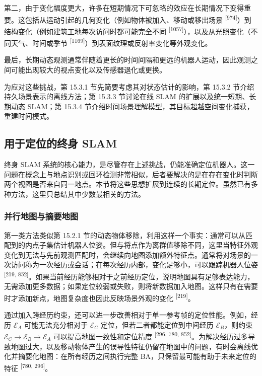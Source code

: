 第二，由于变化幅度更大，许多在短期情况下可忽略的效应在长期情况下变得重要。这包括从运动引起的几何变化（例如物体被加入、移动或移出场景 \textsuperscript{[974]}）到结构变化（例如建筑工地每次访问时都可能完全不同 \textsuperscript{[1057]}），以及从光照变化（不同天气、时间或季节 \textsuperscript{[1169]}）到表面纹理或反射率变化等外观变化。

最后，长期动态观测通常伴随着更长的时间间隔和更远的机器人运动，因此观测之间可能出现较大的视点变化以及传感器退化或更换。

为应对这些挑战，第 15.3.1 节先简要考虑其对状态估计的影响，第 15.3.2 节介绍持久场景表示的离线方法；第 15.3.3 节讨论在线 SLAM 的扩展以及统一短期、长期动态 SLAM；第 15.3.4 节介绍时间场景理解模型，其目标超越空间变化捕获，重建时间模式。

\subsection{用于定位的终身 SLAM}

终身 SLAM 系统的核心能力，是尽管存在上述挑战，仍能准确定位机器人。这一问题在概念上与地点识别或回环检测非常相似，后者要解决的是在存在变化时判断两个视图是否来自同一地点。本节将这些思想扩展到连续的长期定位。虽然已有多种方法，这里只总结其中少数最相关的方法。

\subsubsection{并行地图与摘要地图}

第一类方法类似第 15.2.1 节的动态物体移除，利用这样一个事实：通常可以从匹配到的内点子集估计机器人位姿。但与将点作为离群值移除不同，这里当特征外观变化到无法与先前观测匹配时，会继续向地图添加额外特征点。通常将对场景的一次访问称为一次经历或会话；在每次经历内部，变化足够小，可以跟踪机器人位姿 \textsuperscript{[219, 852]}。如果当前经历能够相对于之前经历定位，说明地图具有足够表达能力，无需添加更多数据；如果定位较弱或失败，则将新数据加入地图。这样只有在需要时才添加新点，地图复杂度也因此反映场景外观的变化 \textsuperscript{[219]}。

通过加入跨经历约束，还可以进一步改善相对于单一参考帧的定位性能。例如，经历 $\mathcal{E}_A$ 可能无法充分相对于 $\mathcal{E}_C$ 定位，但若二者都能定位到中间经历 $\mathcal{E}_B$，则约束 $\mathcal{E}_C\to\mathcal{E}_B\to\mathcal{E}_A$ 可以提高地图一致性和定位精度 \textsuperscript{[296, 780, 852]}。为解决经历过多导致地图过大，以及移动物体产生的误导性特征仍留在地图中的问题，有时会离线优化并摘要化地图：在所有经历之间执行完整 BA，只保留最可能有助于未来定位的特征 \textsuperscript{[780, 296]}。

